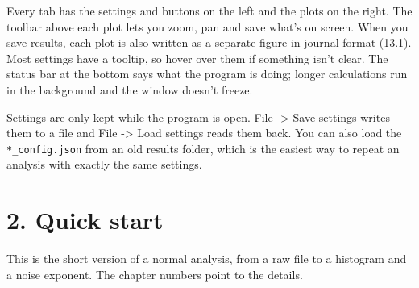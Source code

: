 \documentclass[
  11pt,
  a4paper,
]{article}
\begin{document}
Every tab has the settings and buttons on the left and the plots on the
right. The toolbar above each plot lets you zoom, pan and save what's on
screen. When you save results, each plot is also written as a separate
figure in journal format (13.1). Most settings have a tooltip, so hover
over them if something isn't clear. The status bar at the bottom says
what the program is doing; longer calculations run in the background and
the window doesn't freeze.

Settings are only kept while the program is open. File -\textgreater{}
Save settings writes them to a file and File -\textgreater{} Load
settings reads them back. You can also load the
\texttt{*\_\allowbreak{}config.json} from an old results folder, which
is the easiest way to repeat an analysis with exactly the same settings.

\hypertarget{quick-start}{%
\section{2. Quick start}\label{quick-start}}

This is the short version of a normal analysis, from a raw file to a
histogram and a noise exponent. The chapter numbers point to the
details.
\end{document}
